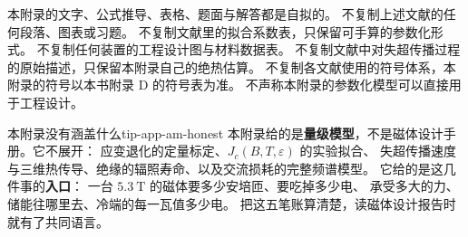 本附录的文字、公式推导、表格、题面与解答都是自拟的。
不复制上述文献的任何段落、图表或习题。
不复制文献里的拟合系数表，只保留可手算的参数化形式。
不复制任何装置的工程设计图与材料数据表。
不复制文献中对失超传播过程的原始描述，只保留本附录自己的绝热估算。
不复制各文献使用的符号体系，本附录的符号以本书附录 D 的符号表为准。
不声称本附录的参数化模型可以直接用于工程设计。

\begin{tip}{本附录没有涵盖什么}{tip-app-am-honest}
本附录给的是\textbf{量级模型}，不是磁体设计手册。它不展开：
应变退化的定量标定、$J_c(B,T,\varepsilon)$ 的实验拟合、
失超传播速度与三维热传导、绝缘的辐照寿命、以及交流损耗的完整频谱模型。
它给的是这几件事的\textbf{入口}：
一台 $5.3\ \mathrm{T}$ 的磁体要多少安培匝、要吃掉多少电、
承受多大的力、储能往哪里去、冷端的每一瓦值多少电。
把这五笔账算清楚，读磁体设计报告时就有了共同语言。
\end{tip}
\endgroup
